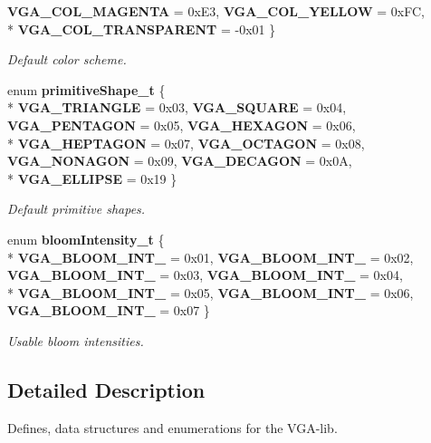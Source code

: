 \begin{DoxyCompactItemize}
{\bfseries V\+G\+A\+\_\+\+C\+O\+L\+\_\+\+M\+A\+G\+E\+N\+TA} = 0x\+E3, 
{\bfseries V\+G\+A\+\_\+\+C\+O\+L\+\_\+\+Y\+E\+L\+L\+OW} = 0x\+FC, 
\\*
{\bfseries V\+G\+A\+\_\+\+C\+O\+L\+\_\+\+T\+R\+A\+N\+S\+P\+A\+R\+E\+NT} = -\/0x01
 \}\label{system_8h_a0a8ef1b5e1941b7257e545cc33405ff1}
\begin{DoxyCompactList}\small\item\em Default color scheme. \end{DoxyCompactList}
\item 
enum {\bf primitive\+Shape\+\_\+t} \{ \\*
{\bfseries V\+G\+A\+\_\+\+T\+R\+I\+A\+N\+G\+LE} = 0x03, 
{\bfseries V\+G\+A\+\_\+\+S\+Q\+U\+A\+RE} = 0x04, 
{\bfseries V\+G\+A\+\_\+\+P\+E\+N\+T\+A\+G\+ON} = 0x05, 
{\bfseries V\+G\+A\+\_\+\+H\+E\+X\+A\+G\+ON} = 0x06, 
\\*
{\bfseries V\+G\+A\+\_\+\+H\+E\+P\+T\+A\+G\+ON} = 0x07, 
{\bfseries V\+G\+A\+\_\+\+O\+C\+T\+A\+G\+ON} = 0x08, 
{\bfseries V\+G\+A\+\_\+\+N\+O\+N\+A\+G\+ON} = 0x09, 
{\bfseries V\+G\+A\+\_\+\+D\+E\+C\+A\+G\+ON} = 0x0A, 
\\*
{\bfseries V\+G\+A\+\_\+\+E\+L\+L\+I\+P\+SE} = 0x19
 \}\label{system_8h_ad01c256642a27f55a733384a49a8b3d7}
\begin{DoxyCompactList}\small\item\em Default primitive shapes. \end{DoxyCompactList}
\item 
enum {\bf bloom\+Intensity\+\_\+t} \{ \\*
{\bfseries V\+G\+A\+\_\+\+B\+L\+O\+O\+M\+\_\+\+I\+N\+T\+\_} = 0x01, 
{\bfseries V\+G\+A\+\_\+\+B\+L\+O\+O\+M\+\_\+\+I\+N\+T\+\_} = 0x02, 
{\bfseries V\+G\+A\+\_\+\+B\+L\+O\+O\+M\+\_\+\+I\+N\+T\+\_} = 0x03, 
{\bfseries V\+G\+A\+\_\+\+B\+L\+O\+O\+M\+\_\+\+I\+N\+T\+\_} = 0x04, 
\\*
{\bfseries V\+G\+A\+\_\+\+B\+L\+O\+O\+M\+\_\+\+I\+N\+T\+\_} = 0x05, 
{\bfseries V\+G\+A\+\_\+\+B\+L\+O\+O\+M\+\_\+\+I\+N\+T\+\_} = 0x06, 
{\bfseries V\+G\+A\+\_\+\+B\+L\+O\+O\+M\+\_\+\+I\+N\+T\+\_} = 0x07
 \}\label{system_8h_a62197901e3d9af649431aae28f33723b}
\begin{DoxyCompactList}\small\item\em Usable bloom intensities. \end{DoxyCompactList}
\end{DoxyCompactItemize}


\subsection{Detailed Description}
Defines, data structures and enumerations for the V\+G\+A-\/lib. 

